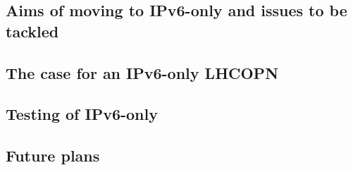 
\subsection{Aims of moving to IPv6-only and issues to be tackled}

\subsection{The case for an IPv6-only LHCOPN}


\subsection{Testing of IPv6-only}


\subsection{Future plans}
